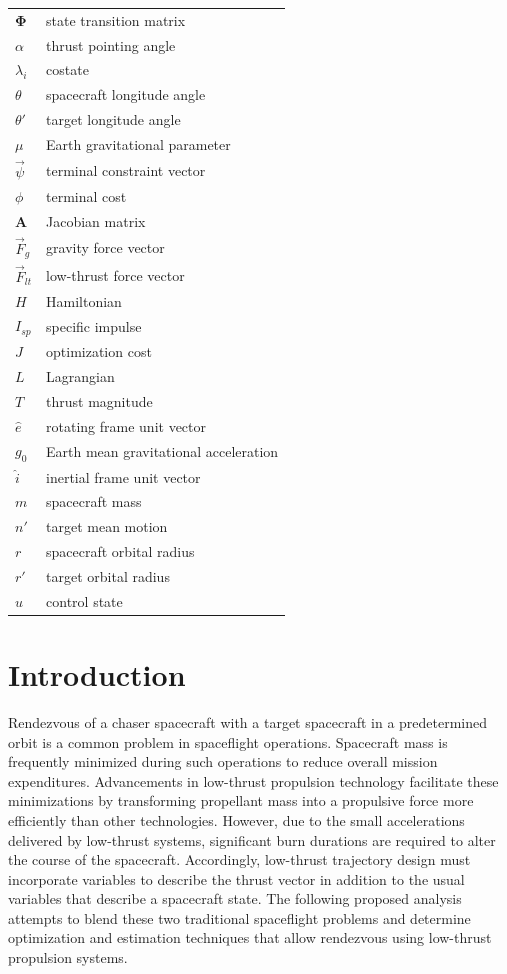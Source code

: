 \documentclass[conf]{new-aiaa}
\begin{document}
{\renewcommand\arraystretch{1.0}
\noindent\begin{longtable*}{@{}l @{\quad=\quad} l@{}}
$\mathbf{\Phi}$ & state transition matrix\\
$\alpha$ & thrust pointing angle\\
$\lambda_i$ & costate\\
$\theta$ & spacecraft longitude angle\\
$\theta'$ & target longitude angle\\
$\mu$ & Earth gravitational parameter\\
$\vec{\psi}$ & terminal constraint vector\\
$\phi$ & terminal cost\\
$\mathbf{A}$ & Jacobian matrix\\
$\vec{F}_g$ & gravity force vector\\
$\vec{F}_{lt}$ & low-thrust force vector\\
$H$ & Hamiltonian\\
$I_{sp}$ & specific impulse\\
$J$ & optimization cost\\
$L$ & Lagrangian\\
$T$ & thrust magnitude\\
$\hat{e}$ & rotating frame unit vector\\
$g_0$ & Earth mean gravitational acceleration\\
$\hat{i}$ & inertial frame unit vector\\
$m$ & spacecraft mass\\
$n'$ & target mean motion\\
$r$ & spacecraft orbital radius\\
$r'$ & target orbital radius\\
$u$ & control state\\
\end{longtable*}}

\section{Introduction}
Rendezvous of a chaser spacecraft with a target spacecraft in a predetermined orbit is a common problem in spaceflight operations. Spacecraft mass is frequently minimized during such operations to reduce overall mission expenditures. Advancements in low-thrust propulsion technology facilitate these minimizations by transforming propellant mass into a propulsive force more efficiently than other technologies. However, due to the small accelerations delivered by low-thrust systems, significant burn durations are required to alter the course of the spacecraft. Accordingly, low-thrust trajectory design must incorporate variables to describe the thrust vector in addition to the usual variables that describe a spacecraft state. The following proposed analysis attempts to blend these two traditional spaceflight problems and determine optimization and estimation techniques that allow rendezvous using low-thrust propulsion systems.
\end{document}
